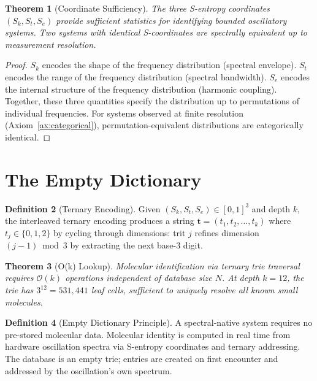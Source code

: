 \documentclass[twocolumn,10pt,a4paper]{article}
\theoremstyle{plain}
\newtheorem{theorem}{Theorem}[section]
\theoremstyle{definition}
\newtheorem{definition}[theorem]{Definition}
\theoremstyle{remark}
\newcommand{\Sk}{S_k}
\newcommand{\St}{S_t}
\newcommand{\Se}{S_e}
\newcommand{\BigO}{\mathcal{O}}
\begin{document}
\begin{theorem}[Coordinate Sufficiency]
\label{thm:sufficiency}
The three S-entropy coordinates $(\Sk, \St, \Se)$ provide sufficient statistics for identifying bounded oscillatory systems. Two systems with identical S-coordinates are spectrally equivalent up to measurement resolution.
\end{theorem}

\begin{proof}
$\Sk$ encodes the shape of the frequency distribution (spectral envelope). $\St$ encodes the range of the frequency distribution (spectral bandwidth). $\Se$ encodes the internal structure of the frequency distribution (harmonic coupling). Together, these three quantities specify the distribution up to permutations of individual frequencies. For systems observed at finite resolution (Axiom~\ref{ax:categorical}), permutation-equivalent distributions are categorically identical.
\end{proof}

\section{The Empty Dictionary}
\label{sec:empty_dict}

\begin{definition}[Ternary Encoding]
\label{def:ternary}
Given $(\Sk, \St, \Se) \in [0,1]^3$ and depth $k$, the interleaved ternary encoding produces a string $\mathbf{t} = (t_1, t_2, \ldots, t_k)$ where $t_j \in \{0, 1, 2\}$ by cycling through dimensions: trit $j$ refines dimension $(j-1) \bmod 3$ by extracting the next base-3 digit.
\end{definition}

\begin{theorem}[O(k) Lookup]
\label{thm:lookup}
Molecular identification via ternary trie traversal requires $\BigO(k)$ operations independent of database size $N$. At depth $k = 12$, the trie has $3^{12} = 531{,}441$ leaf cells, sufficient to uniquely resolve all known small molecules.
\end{theorem}

\begin{definition}[Empty Dictionary Principle]
\label{def:empty_dict}
A spectral-native system requires no pre-stored molecular data. Molecular identity is computed in real time from hardware oscillation spectra via S-entropy coordinates and ternary addressing. The database is an empty trie; entries are created on first encounter and addressed by the oscillation's own spectrum.
\end{definition}
\end{document}
